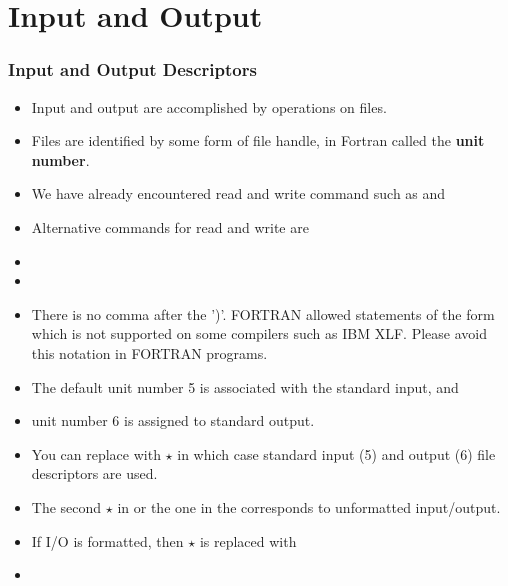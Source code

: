 \documentclass[10pt,t]{beamer}
\begin{document}
\section{Input and Output}
\begin{frame}
  \frametitle{Input and Output Descriptors}
  \begin{itemize}
    \item Input and output are accomplished by operations on files.
    \item Files are identified by some form of file handle, in Fortran called the \textbf{unit number}.
    \item We have already encountered read and write command such as  and 
    \item Alternative commands for read and write are 
    \item[] 
    \item[] 
    \item There is no comma after the ')'. FORTRAN allowed statements of the form  which is not supported on some compilers such as IBM XLF. Please avoid this notation in FORTRAN programs.
    \item The default unit number 5 is associated with the standard input, and
    \item unit number 6 is assigned to standard output.
    \item You can replace  with $\star$ in which case standard input (5) and output (6) file descriptors are used.
    \item The second $\star$ in  or the one in the  corresponds to unformatted input/output.
    \item If I/O is formatted, then $\star$ is replaced with
    \item[]
  \end{itemize}
\end{frame}
\end{document}

